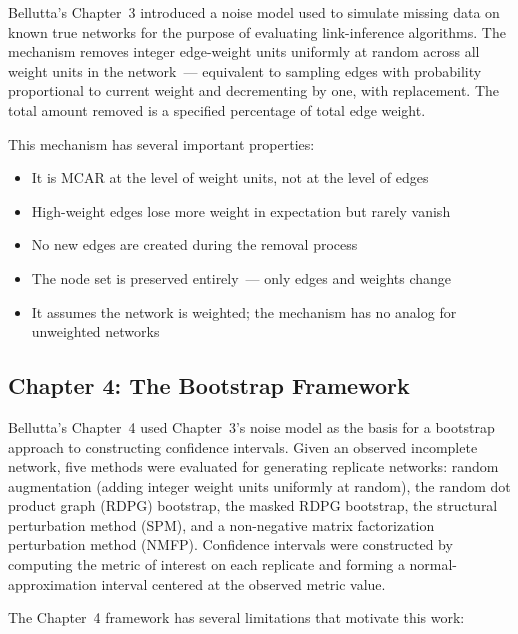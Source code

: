 \documentclass[11pt]{article}
\begin{document}
Bellutta's Chapter~3 introduced a noise model used to simulate missing data on known true networks for the purpose of evaluating link-inference algorithms. The mechanism removes integer edge-weight units uniformly at random across all weight units in the network~--- equivalent to sampling edges with probability proportional to current weight and decrementing by one, with replacement. The total amount removed is a specified percentage of total edge weight.

This mechanism has several important properties:
\begin{itemize}[leftmargin=*, itemsep=2pt]
  \item It is MCAR at the level of weight units, not at the level of edges
  \item High-weight edges lose more weight in expectation but rarely vanish
  \item No new edges are created during the removal process
  \item The node set is preserved entirely~--- only edges and weights change
  \item It assumes the network is weighted; the mechanism has no analog for unweighted networks
\end{itemize}

\subsection{Chapter 4: The Bootstrap Framework}

Bellutta's Chapter~4 used Chapter~3's noise model as the basis for a bootstrap approach to constructing confidence intervals. Given an observed incomplete network, five methods were evaluated for generating replicate networks: random augmentation (adding integer weight units uniformly at random), the random dot product graph (RDPG) bootstrap, the masked RDPG bootstrap, the structural perturbation method (SPM), and a non-negative matrix factorization perturbation method (NMFP). Confidence intervals were constructed by computing the metric of interest on each replicate and forming a normal-approximation interval centered at the observed metric value.

The Chapter~4 framework has several limitations that motivate this work:
\end{document}
